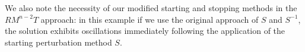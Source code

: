 We also note the necessity of our modified starting and stopping methods in the $RM^{n-2}T$ approach: in this
example if we use the original approach of $S$ and $S^{-1}$,
the solution exhibits oscillations immediately following the
application of the starting perturbation method $S$.






